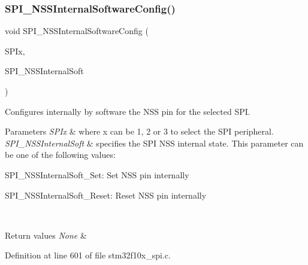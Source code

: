 \subsubsection{\texorpdfstring{S\+P\+I\+\_\+\+N\+S\+S\+Internal\+Software\+Config()}{SPI\_NSSInternalSoftwareConfig()}}
{\footnotesize\ttfamily void S\+P\+I\+\_\+\+N\+S\+S\+Internal\+Software\+Config (\begin{DoxyParamCaption}\item[{\hyperlink{struct_s_p_i___type_def}{S\+P\+I\+\_\+\+Type\+Def} $\ast$}]{S\+P\+Ix,  }\item[{uint16\+\_\+t}]{S\+P\+I\+\_\+\+N\+S\+S\+Internal\+Soft }\end{DoxyParamCaption})}



Configures internally by software the N\+SS pin for the selected S\+PI. 


\begin{DoxyParams}{Parameters}
{\em S\+P\+Ix} & where x can be 1, 2 or 3 to select the S\+PI peripheral. \\
\hline
{\em S\+P\+I\+\_\+\+N\+S\+S\+Internal\+Soft} & specifies the S\+PI N\+SS internal state. This parameter can be one of the following values\+: \begin{DoxyItemize}
\item S\+P\+I\+\_\+\+N\+S\+S\+Internal\+Soft\+\_\+\+Set\+: Set N\+SS pin internally \item S\+P\+I\+\_\+\+N\+S\+S\+Internal\+Soft\+\_\+\+Reset\+: Reset N\+SS pin internally \end{DoxyItemize}
\\
\hline
\end{DoxyParams}

\begin{DoxyRetVals}{Return values}
{\em None} & \\
\hline
\end{DoxyRetVals}


Definition at line 601 of file stm32f10x\+\_\+spi.\+c.

\mbox{\label{group___s_p_i___private___functions_ga4ec54abdedf6cd17403d853a926d91c1}} 
